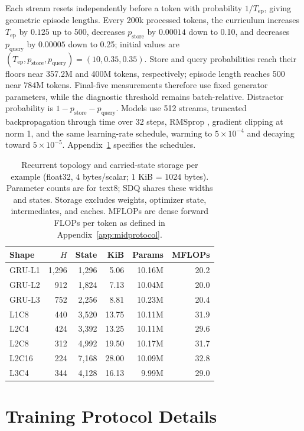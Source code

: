 \documentclass[letterpaper,twoside]{article}
\begin{document}
Each stream resets independently before a token with probability $1/T_{\mathrm{ep}}$, giving geometric episode lengths. Every 200k processed tokens, the curriculum increases $T_{\mathrm{ep}}$ by $0.125$ up to 500, decreases $p_{\mathrm{store}}$ by $0.00014$ down to 0.10, and decreases $p_{\mathrm{query}}$ by $0.00005$ down to 0.25; initial values are $(T_{\mathrm{ep}},p_{\mathrm{store}},p_{\mathrm{query}})=(10,0.35,0.35)$. Store and query probabilities reach their floors near 357.2M and 400M tokens, respectively; episode length reaches 500 near 784M tokens. Final-five measurements therefore use fixed generator parameters, while the diagnostic threshold remains batch-relative. Distractor probability is $1-p_{\mathrm{store}}-p_{\mathrm{query}}$. Models use 512 streams, truncated backpropagation through time over 32 steps, RMSprop \citep{tieleman2012rmsprop}, gradient clipping at norm 1, and the same learning-rate schedule, warming to $5\times10^{-4}$ and decaying toward $5\times10^{-5}$. Appendix~\ref{app:protocol} specifies the schedules.


\begin{table}[t]
\centering
\caption{Recurrent topology and carried-state storage per example (float32, $4$ bytes/scalar; $1$ KiB = $1024$ bytes). Parameter counts are for text8; SDQ shares these widths and states. Storage excludes weights, optimizer state, intermediates, and caches. MFLOPs are dense forward FLOPs per token as defined in Appendix~\ref{app:midprotocol}.}
\label{tab:topology}
\small
\begin{tabular}{lrrrrr}
\toprule
Shape & $H$ & State & KiB & Params & MFLOPs \\
\midrule
GRU-L1 & 1,296 & 1,296 & 5.06 & 10.16M & 20.2 \\
GRU-L2 & 912 & 1,824 & 7.13 & 10.04M & 20.0 \\
GRU-L3 & 752 & 2,256 & 8.81 & 10.23M & 20.4 \\
\midrule
L1C8 & 440 & 3,520 & 13.75 & 10.11M & 31.9 \\
L2C4 & 424 & 3,392 & 13.25 & 10.11M & 29.6 \\
L2C8 & 312 & 4,992 & 19.50 & 10.17M & 31.7 \\
L2C16 & 224 & 7,168 & 28.00 & 10.09M & 32.8 \\
L3C4 & 344 & 4,128 & 16.13 & 9.99M & 29.0 \\
\bottomrule
\end{tabular}
\end{table}

\section{Training Protocol Details}\label{app:protocol}
\end{document}
